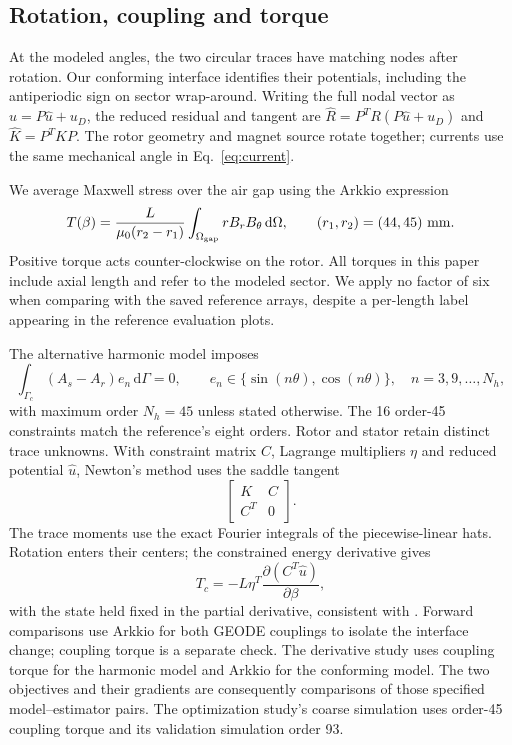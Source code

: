 \documentclass{anvil-paper}
\newcommand{\dd}{\,\mathrm{d}}
\begin{document}
\subsection{Rotation, coupling and torque}
At the modeled angles, the two circular traces have matching nodes after
rotation. Our conforming interface identifies their potentials, including
the antiperiodic sign on sector wrap-around. Writing the full nodal vector
as $u=P\hat u+u_D$, the reduced residual and tangent are
$\hat R=P^T R(P\hat u+u_D)$ and $\hat K=P^T K P$.
The rotor geometry and magnet source rotate together; currents use the
same mechanical angle in Eq.~\eqref{eq:current}.

We average Maxwell stress over the air gap using the Arkkio expression
\citep{arkkio1987}
\begin{equation}
 T(\beta)=\frac{L}{\mu_0(r_2-r_1)}
  \int_{\Omega_{\rm gap}}r B_r B_\theta\dd\Omega,
 \qquad(r_1,r_2)=(44,45)\ {\rm mm}.
 \label{eq:torque}
\end{equation}
Positive torque acts counter-clockwise on the rotor. All torques in this
paper include axial length and refer to the modeled sector. We apply no
factor of six when comparing with the saved reference arrays, despite a
per-length label appearing in the reference evaluation plots.

The alternative harmonic model imposes
\begin{equation}
 \int_{\Gamma_c}(A_s-A_r)e_n\dd\Gamma=0,\qquad
 e_n\in\{\sin(n\theta),\cos(n\theta)\},\quad n=3,9,\ldots,N_h,
\end{equation}
with maximum order $N_h=45$ unless stated otherwise. The 16 order-45
constraints match the reference's eight orders. Rotor and stator
retain distinct trace unknowns. With constraint matrix $C$, Lagrange
multipliers $\eta$ and reduced potential $\hat u$, Newton's method uses
the saddle tangent
\begin{equation}
 \begin{bmatrix}K&C\\ C^T&0\end{bmatrix}.
\end{equation}
The trace moments use the exact Fourier integrals of the piecewise-linear
hats. Rotation enters their centers; the constrained energy derivative gives
\begin{equation}
 T_c=-L\eta^T\frac{\partial(C^T\hat u)}{\partial\beta},
 \label{eq:couplingtorque}
\end{equation}
with the state held fixed in the partial derivative, consistent with
\citet{egger2022torque}. Forward comparisons use Arkkio for both GEODE
couplings to isolate the interface change; coupling torque is a separate
check. The derivative study uses coupling torque for the harmonic model
and Arkkio for the conforming model. The two objectives and their gradients
are consequently comparisons of those specified model--estimator pairs.
The optimization study's coarse simulation uses order-45 coupling torque and
its validation simulation order 93.
\end{document}
